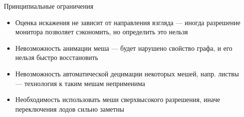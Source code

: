 \begin{frame}{Принципиальные ограничения}
    \begin{itemize}
        \item Оценка искажения не зависит от направления взгляда
        --- иногда разрешение монитора позволяет сэкономить, но определить это нельзя
        \item Невозможность анимации меша --- будет нарушено свойство графа, и его нельзя быстро восстановить
        \item Невозможность автоматической децимации некоторых мешей, напр. листвы --- технология к таким мешам неприменима
        \item Необходимость использовать меши сверхвысокого разрешения, иначе переключения лодов сильно заметны
    \end{itemize}
\end{frame}


